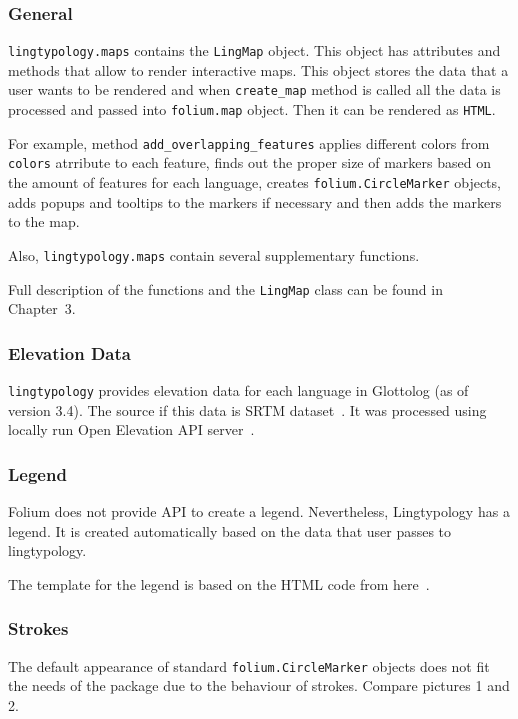 \documentclass[a4paper,12pt]{article}
\begin{document}
\subsubsection{General}
\texttt{lingtypology.maps} contains the \texttt{LingMap} object. This object has attributes and methods that allow to render interactive maps. This object stores the data that a user wants to be rendered and when \texttt{create\_map} method is called all the data is processed and passed into \texttt{folium.map} object. Then it can be rendered as \texttt{HTML}.

For example, method \texttt{add\_overlapping\_features} applies different colors from \texttt{colors} atrribute to each feature, finds out the proper size of markers based on the amount of features for each language, creates 
\texttt{folium.CircleMarker} objects, adds popups and tooltips to the markers if necessary and then adds the markers to the map.

Also, \texttt{lingtypology.maps} contain several supplementary functions.

Full description of the functions and the \texttt{LingMap} class can be found in Chapter~3.

\subsubsection{Elevation Data}
\texttt{lingtypology} provides elevation data for each language in Glottolog (as of version 3.4). The source if this data is SRTM dataset~\parencite{SRTM}.
It was processed using locally run Open Elevation API server~\parencite{OpenElevation}.

\subsubsection{Legend}
Folium does not provide API to create a legend. Nevertheless, Lingtypology has a legend. It is created automatically based on the data that user passes to lingtypology.

The template for the legend is based on the HTML code from here~\parencite{legend}.

\subsubsection{Strokes}
The default appearance of standard \texttt{folium.CircleMarker} objects does not fit the needs of the package due to the behaviour of strokes. Compare pictures 1 and 2.
\end{document}
